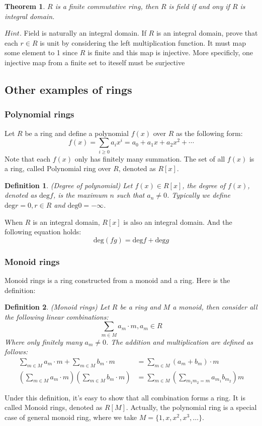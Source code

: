 \documentclass[a4paper, pdf, 11.5pt]{article}
\newtheorem{definition}{Definition}
\newtheorem{theorem}{Theorem}
\begin{document}
\begin{theorem}
 $R$ is a finite commutative ring, then $R$ is field if and ony if $R$ is integral domain.
\end{theorem}
\noindent
$\textit{Hint}.$ Field is naturally an integral domain. If $R$ is an integral domain, prove that each $r\in R$ is unit by considering the left multiplication function. It must map some element to 1 since $R$ is finite and this map is injective.
More specificly, one injective map from a finite set to iteself must be surjective
\vspace{0.5cm}

\subsection{Other examples of rings}
\subsubsection{Polynomial rings}
Let $R$ be a ring and define a polynomial $f(x)$ over $R$ as the following form:
$$
f(x) = \sum_{i\geq 0}a_ix^{i} = a_0+ a_1x+a_2x^{2}+\cdots
$$
Note that each $f(x)$ only has finitely many summation. The set of all $f(x)$ is a ring, called Polynomial ring over $R$, denoted as $R[x]$. 

\begin{definition}(Degree of polynomial)
Let $f(x)\in R[x]$, the degree of $f(x)$, denoted as $\mbox{deg}f$, is the maximum $n$ such that $a_{n}\neq 0$.  Typically we define $\mbox{deg}r = 0, r\in R$ and $\mbox{deg}0 = -\infty$.
\end{definition}

When $R$ is an integral domain, $R[x]$ is also an integral domain. And the following equation holds:
$$
\mbox{deg}(fg) = \mbox{deg}f + \mbox{deg}g
$$

\subsubsection{Monoid rings}
Monoid rings is a ring constructed from a monoid and a ring. Here is the definition:
\begin{definition}(Monoid rings)
Let $R$ be a ring and $M$ a monoid, then consider all the following linear combinations:
$$
\sum_{m\in M}a_{m}\cdot m, a_{m}\in R
$$
Where only finitely many $a_{m}\neq 0$. The addition and multiplication are defined as follows:
$$
\begin{aligned}
\sum_{m\in M}a_{m}\cdot m+\sum_{m\in M}b_{m}\cdot m &= \sum_{m\in M}(a_m+b_m)\cdot m\\
(\sum_{m\in M}a_{m}\cdot m)(\sum_{m\in M}b_{m}\cdot m) &=\sum_{m\in M}(\sum_{m_1m_2=m}a_{m_1}b_{m_2})m
\end{aligned}
$$
\end{definition}
\vspace{0.3cm}
Under this definition, it's easy to show that all combination forms a ring. It is called Monoid rings, 
denoted as $R[M]$. Actually, the polynomial ring is a special case of general monoid ring, where we take 
$M=\{1, x, x^{2}, x^{3}, \dots \}$. 
\end{document}
